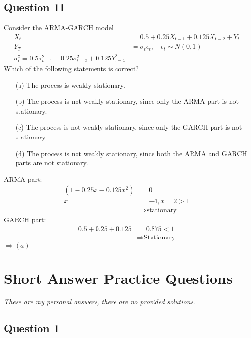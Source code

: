 \subsection*{Question 11}

Consider the ARMA-GARCH model \begin{align*}
    X_t &= 0.5+0.25 X_{t-1} + 0.125 X_{t-2} + Y_t \\
    Y_T &= \sigma_t \epsilon_t, \quad \epsilon_t \sim N(0,1)\\
    \sigma^2_t = 0.5\sigma_{t-1}^2 + 0.25 \sigma_{t-2}^2 + 0.125 Y_{t-1}^2 
\end{align*}
Which of the following statements is correct?

\begin{itemize}
    \item[(a)] The process is weakly stationary.
    \item[(b)] The process is not weakly stationary, since only the ARMA part is not stationary.
    \item[(c)] The process is not weakly stationary, since only the GARCH part is not stationary.
    \item[(d)] The process is not weakly stationary, since both the ARMA and GARCH parts are not stationary.
\end{itemize}

\begin{footnotesize}
    ARMA part: \begin{align*}
    (1-0.25x-0.125x^2) &= 0 \\
    x &= -4, x= 2 > 1 \\
    &\Rightarrow \text{stationary}
    \end{align*}
    GARCH part: \begin{align*}
        0.5 + 0.25 + 0.125 &= 0.875 < 1\\
        &\Rightarrow \text{Stationary}
    \end{align*}
    $\Rightarrow (a)$
\end{footnotesize}



\section{Short Answer Practice Questions}
\textit{
These are my personal answers, there are no provided solutions.}

\subsection*{Question 1}

